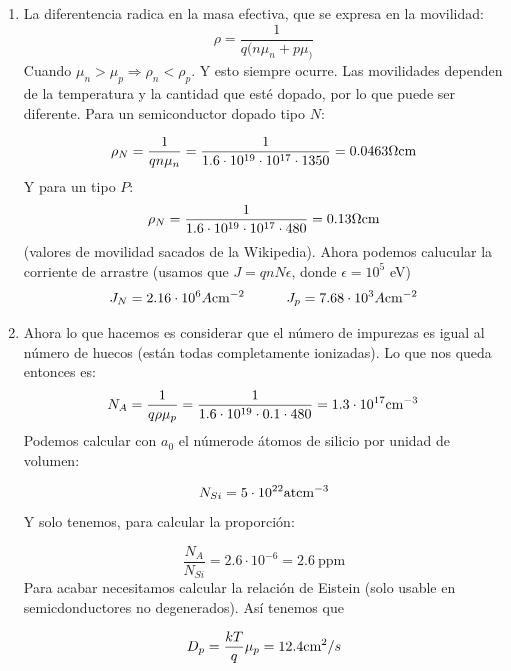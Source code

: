 \begin{enumerate}[label=\alph*)]
	\item La diferentencia radica en la masa efectiva, que se expresa en la movilidad:
		  \begin{equation}
			  \rho = \frac{1}{q(n\mu_n + p \mu_)}
		  \end{equation}
		  Cuando $\mu_n>\mu_p \Rightarrow \rho_n < \rho_p$. Y esto siempre ocurre. Las movilidades dependen de la temperatura y la cantidad que esté dopado, por lo que puede ser diferente. Para un semiconductor dopado tipo $N$:

		  \begin{equation}
			  \rho_N = \frac{1}{qn{\mu_n}} = \frac{1}{1.6\cdot 10^{19} \cdot 10^{17}\cdot 1350}= 0.0463 \Omega \text{cm}
		  \end{equation}
		  Y para un tipo $P$:
		  \begin{equation}
			  \rho_N = \frac{1}{1.6\cdot 10^{19} \cdot 10^{17}\cdot 480} = 0.13 \Omega \text{cm}
		  \end{equation}
		  (valores de movilidad sacados de la Wikipedia). Ahora podemos calucular la corriente de arrastre (usamos que $J=qnN\epsilon$, donde $\epsilon = 10^5$ eV)
		  \begin{equation}
			  J_N =  2.16 \cdot 10^6  A\text{cm}^{-2}  \quad \quad \quad J_p = 7.68 \cdot 10^3  A\text{cm}^{-2}
		  \end{equation}
	\item Ahora lo que hacemos es considerar que el número de impurezas es igual al número de huecos (están todas completamente ionizadas). Lo que nos queda entonces es:
		  \begin{equation}
			  N_A = \frac{1}{q\rho \mu_p } = \frac{1}{1.6\cdot 10^{19} \cdot 0.1 \cdot 480} = 1.3 \cdot 10^{17} \text{cm}^{-3}
		  \end{equation}
		  Podemos calcular con $a_0$ el númerode átomos de silicio por unidad de volumen:

		  \begin{equation}
			  N_{Si} = 5 \cdot 10^{22} \text{at} \text{cm}^{-3}
		  \end{equation}
		  Y solo tenemos, para calcular la proporción:

		  \begin{equation}
			  \frac{N_A}{N_{Si}} = 2.6 \cdot 10^{-6} = 2.6 \ \text{ppm}
		  \end{equation}
		  Para acabar necesitamos calcular la relación de Eistein (solo usable en semicdonductores no degenerados). Así tenemos que

		  \begin{equation}
			  D_p = \frac{kT}{q} \mu_p = 12.4 \text{cm}^2 / s
		  \end{equation}
\end{enumerate}

